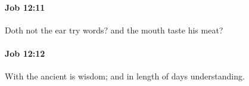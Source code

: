 		\paragraph{Job 12:11} %
			\label{JOB-12-11}

			Doth not the ear try words? and the mouth taste his meat?


		\paragraph{Job 12:12} %
			\label{JOB-12-12}

			With the ancient is wisdom; and in length of days understanding.


